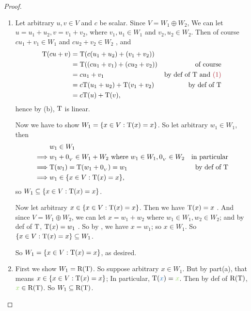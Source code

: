 \begin{proof} \ 
\begin{enumerate}
\item
Let arbitrary \(u, v \in V\) and \(c\) be scalar.
Since \(V = W_1 \oplus W_2\), We can let \(u = u_1 + u_2, v = v_1 + v_2\), where \(v_1, u_1 \in W_1\) and \(v_2, u_2 \in W_2\).
Then of course \(c u_1 + v_1 \in W_1\) and \(c u_2 + v_2 \in W_2\) \MAROON{(1)}, and
\begin{align*}
    \T(cu + v) & = \T(c(u_1 + u_2) + (v_1 + v_2)) \\
               & = \T((c u_1 + v_1) + (c u_2 + v_2)) & \text{of course} \\
               & = c u_1 + v_1 & \text{by def of \(\T\) and \MAROON{(1)}} \\
               & = c \T(u_1 + u_2) + \T(v_1 + v_2) & \text{by def of \(\T\)} \\
               & = c \T(u) + \T(v),
\end{align*}
hence by (b), \(\mathrm{T}\) is linear.

Now we have to show \(W_1 = \{ x \in V : \mathrm{T}(x) = x \}\).
So let arbitrary \(w_1 \in W_1\), then
\begin{align*}
             & w_1 \in W_1 \\
    \implies & w_1 + 0_{_V} \in W_1 + W_2 \text{ where } w_1 \in W_1, 0_{_V} \in W_2 & \text{in particular} \\
    \implies & \mathrm{T}(w_1) = \mathrm{T}(w_1 + 0_{_V}) = w_1 & \text{by def of \(\mathrm{T}\)} \\
    \implies & w_1 \in \{ x \in V : \mathrm{T}(x) = x \},
\end{align*}
so \(W_1 \subseteq \{ x \in V : \mathrm{T}(x) = x \}\).

Now let arbitrary \(x \in \{ x \in V : \mathrm{T}(x) = x \}\).
Then we have \(\mathrm{T}(x) = x\) .
And since \(V = W_1 \oplus W_2\), we can let \(x = w_1 + w_2\) where \(w_1 \in W_1, w_2 \in W_2\);
and by def of \(\mathrm{T}\), \(\mathrm{T}(x) = w_1\) \MAROON{(3)}.
So by , we have \(x = w_1\); so \(x \in W_1\).
So \(\{ x \in V : \mathrm{T}(x) = x \} \subseteq W_1\).

So \(W_1 = \{ x \in V : \mathrm{T}(x) = x\}\), as desired.

\item
First we show \(W_1 = \mathrm{R(T)}\).
So suppose arbitrary \(x \in W_1\).
But by part(a), that means \(x \in \{x \in V : \mathrm{T}(x) = x\}\);
In particular, \(\T(\BLUE{x}) = \GREEN{x}\).
Then by def of \(\mathrm{R(T)}\), \(\GREEN{x} \in \RANGET\).
So \(W_1 \subseteq \mathrm{R(T)}\).


\end{enumerate}
\end{proof}
